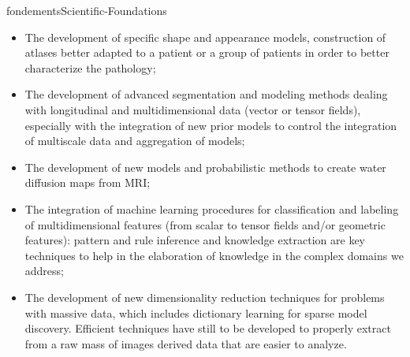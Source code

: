\documentclass{ra2018}
\begin{document}
\begin{module}{fondements}{Scientific-Foundations}{}
        \begin{itemize}
          \item The development of specific shape and appearance models, construction
          of atlases better adapted to a patient or a group of patients in order to
          better characterize the pathology;
          \item The development of advanced segmentation and modeling methods dealing
          with longitudinal and multidimensional data (vector or tensor fields),
          especially with the integration of new prior models to control the
          integration of multiscale data and aggregation of models;
          \item The development of new models and probabilistic methods to create water
          diffusion maps from MRI;
          \item The integration of machine learning procedures for classification and
          labeling of multidimensional features (from scalar to tensor fields and/or
          geometric features): pattern and rule inference and knowledge extraction are
          key techniques to help in the elaboration of knowledge in the complex domains
          we address;
          \item The development of new dimensionality reduction techniques for problems
          with massive data, which includes dictionary learning for sparse model
          discovery. Efficient techniques have still to be developed to properly
          extract from a raw mass of images derived data that are easier to analyze.
        \end{itemize}
        \end{module}
\end{document}
